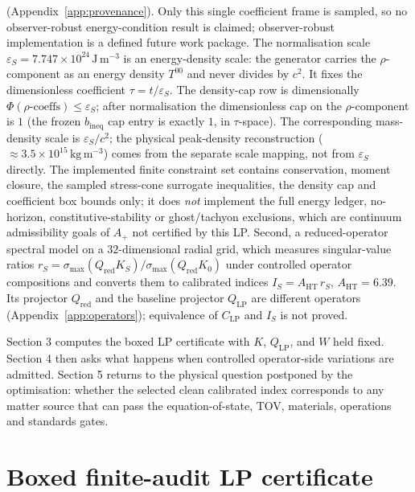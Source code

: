 \documentclass[11pt,a4paper]{article}
\begin{document}
(Appendix~\ref{app:provenance}). Only this single coefficient frame is sampled, so no observer-robust energy-condition result is claimed; observer-robust implementation is a defined future work package. The normalisation scale $\varepsilon_{S}=7.747\times10^{24}\,\mathrm{J\,m^{-3}}$ is an energy-density scale: the generator carries the $\rho$-component as an energy density $T^{00}$ and never divides by $c^{2}$. It fixes the dimensionless coefficient $\tau=t/\varepsilon_{S}$. The density-cap row is dimensionally $\Phi(\rho\text{-coeffs})\le\varepsilon_{S}$; after normalisation the dimensionless cap on the $\rho$-component is $1$ (the frozen $b_{\mathrm{ineq}}$ cap entry is exactly $1$, in $\tau$-space). The corresponding mass-density scale is $\varepsilon_{S}/c^{2}$; the physical peak-density reconstruction ($\approx3.5\times10^{15}\,\mathrm{kg\,m^{-3}}$) comes from the separate scale mapping, not from $\varepsilon_{S}$ directly. The implemented finite constraint set contains conservation, moment closure, the sampled stress-cone surrogate inequalities, the density cap and coefficient box bounds only; it does \emph{not} implement the full energy ledger, no-horizon, constitutive-stability or ghost/tachyon exclusions, which are continuum admissibility goals of $A_{+}$ not certified by this LP. Second, a reduced-operator spectral model on a $32$-dimensional radial grid, which measures singular-value ratios $r_{S}=\sigma_{\max}(Q_{\mathrm{red}}K_{S})/\sigma_{\max}(Q_{\mathrm{red}}K_{0})$ under controlled operator compositions and converts them to calibrated indices $I_{S}=A_{\mathrm{HT}}\,r_{S}$, $A_{\mathrm{HT}}=6.39$. Its projector $Q_{\mathrm{red}}$ and the baseline projector $Q_{\mathrm{LP}}$ are different operators (Appendix~\ref{app:operators}); equivalence of $C_{\mathrm{LP}}$ and $I_{S}$ is not proved.

Section 3 computes the boxed LP certificate with $K$, $Q_{\mathrm{LP}}$, and $W$ held fixed. Section 4 then asks what happens when controlled operator-side variations are admitted. Section 5 returns to the physical question postponed by the optimisation: whether the selected clean calibrated index corresponds to any matter source that can pass the equation-of-state, TOV, materials, operations and standards gates.

\section{Boxed finite-audit LP certificate}\label{sec:fixed-op}
\end{document}
